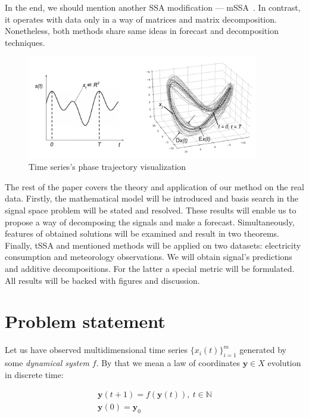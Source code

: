 	In the end, we should mention another SSA modification --- mSSA~\cite{mSSA_overview}. In contrast, it operates with data only in a way of matrices and matrix decomposition. Nonetheless, both methods share same ideas in forecast and decomposition techniques.
	
	\begin{figure}[h]
		\centering
		\includegraphics[width=0.9\textwidth, keepaspectratio]{../../figs/phase_traj.png}
		\caption{Time series's phase trajectory visualization }\label{pic:phase_traj}
	\end{figure}
	
	The rest of the paper covers the theory and application of our method on the real data. Firstly, the mathematical model will be introduced and basis search in the signal space problem will be stated and resolved. These results will enable us to propose a way of decomposing the signals and make a forecast. Simultaneously, features of obtained solutions will be examined and result in two theorems. Finally, tSSA and mentioned methods will be applied on two datasets: electricity consumption and meteorology observations. We will obtain signal's predictions and additive decompositions. For the latter a special metric will be formulated. All results will be backed with figures and discussion.
	
	\section{Problem statement}\label{sec:problem_statement}
	
	Let us have observed multidimensional time series $ \{x_i(t)\}_{i=1}^m $ generated by some \emph{dynamical system} $ f $. By that we mean a law of coordinates $ \mathbf{y} \in X $ evolution in discrete time:
	
	\begin{gather*}
		\mathbf{y}(t + 1) = f(\mathbf{y}(t)), \ t \in \mathbb{N} \\
		\mathbf{y}(0) = \mathbf{y}_0
	\end{gather*}
	
